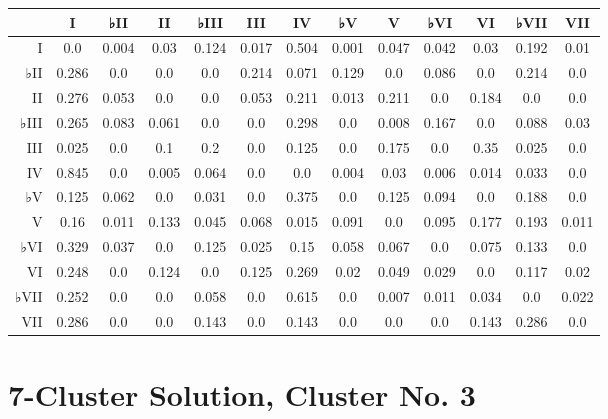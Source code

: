 \begin{table}[htbp]
\begin{minipage}{\linewidth}
\setlength{\tymax}{0.5\linewidth}
\centering
\small
\begin{tabulary}{\textwidth}{@{}RCCCCCCCCCCCC@{}} \toprule
&I&♭II&II&♭III&III&IV&♭V&V&♭VI&VI&♭VII&VII\\
\midrule
I&0.0&0.004&0.03&0.124&0.017&0.504&0.001&0.047&0.042&0.03&0.192&0.01\\
♭II&0.286&0.0&0.0&0.0&0.214&0.071&0.129&0.0&0.086&0.0&0.214&0.0\\
II&0.276&0.053&0.0&0.0&0.053&0.211&0.013&0.211&0.0&0.184&0.0&0.0\\
♭III&0.265&0.083&0.061&0.0&0.0&0.298&0.0&0.008&0.167&0.0&0.088&0.03\\
III&0.025&0.0&0.1&0.2&0.0&0.125&0.0&0.175&0.0&0.35&0.025&0.0\\
IV&0.845&0.0&0.005&0.064&0.0&0.0&0.004&0.03&0.006&0.014&0.033&0.0\\
♭V&0.125&0.062&0.0&0.031&0.0&0.375&0.0&0.125&0.094&0.0&0.188&0.0\\
V&0.16&0.011&0.133&0.045&0.068&0.015&0.091&0.0&0.095&0.177&0.193&0.011\\
♭VI&0.329&0.037&0.0&0.125&0.025&0.15&0.058&0.067&0.0&0.075&0.133&0.0\\
VI&0.248&0.0&0.124&0.0&0.125&0.269&0.02&0.049&0.029&0.0&0.117&0.02\\
♭VII&0.252&0.0&0.0&0.058&0.0&0.615&0.0&0.007&0.011&0.034&0.0&0.022\\
VII&0.286&0.0&0.0&0.143&0.0&0.143&0.0&0.0&0.0&0.143&0.286&0.0\\

\bottomrule

\end{tabulary}
\end{minipage}
\end{table}

\section{7-Cluster Solution, Cluster No. 3}
\label{7-clustersolutionclusterno.3}

